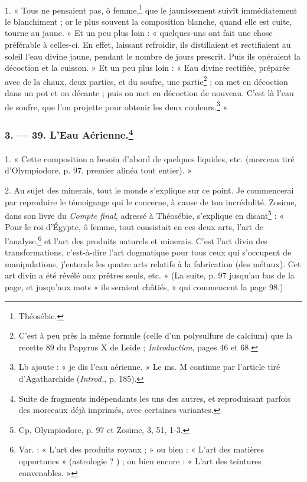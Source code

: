 \documentclass[landscape, a4paper, 11pt, oneside, polutonikogreek, french]{article}
\begin{document}
\paragraph{}
1. « Tous ne pensaient pas, ô femme,\footnote{Théosébie.} que le jaunissement suivît immédiatement le blanchiment ; or le plus souvent la composition blanche, quand elle est cuite, tourne au jaune. » Et un peu plus loin : « quelques-uns ont fait une chose préférable à celles-ci. En effet, laissant refroidir, ils distillaient et rectifiaient au soleil l'eau divine jaune, pendant le nombre de jours prescrit. Puis ils opéraient la décoction et la cuisson. » Et un peu plus loin : « Eau divine rectifiée, préparée avec de la chaux, deux parties, et du soufre, une partie\footnote{C'est à peu près la même formule (celle d'un polysulfure de calcium) que la recette 89 du Papyrus X de Leide ; \emph{Introduction}, pages 46 et 68.} ; on met en décoction dans un pot et on décante ; puis on met en décoction de nouveau. C'est là l'eau de soufre, que l'on projette pour obtenir les deux couleurs.\footnote{Lb ajoute : « je dis l'eau aérienne. » Le ms. M continue par l'article tiré d'Agatharchide (\emph{Introd.}, p. 185).} »

\bigskip
\centerline{\EightStarTaper}
\centerline{\EightStarTaper\EightStarTaper}
\bigskip

\subsubsection[3. --- 39. L'Eau Aérienne.]{3. --- 39. L'Eau Aérienne.\footnote{Suite de fragments indépendants les uns des autres, et reproduisant parfois des morceaux déjà imprimés, avec certaines variantes.}}
\paragraph{}
1. « Cette composition a besoin d'abord de quelques liquides, etc. (morceau tiré d'Olympiodore, p. 97, premier alinéa tout entier). »

2. Au sujet des minerais, tout le monde s'explique sur ce point. Je commencerai par reproduire le témoignage qui le concerne, à cause de ton incrédulité. Zosime, dans son livre du \emph{Compte final}, adressé à Théosébie, s'explique en disant\footnote{Cp. Olympiodore, p. 97 et Zosime, 3, 51, 1-3.} : « Pour le roi d'Égypte, ô femme, tout consistait en ces deux arts, l'art de l'analyse,\footnote{Var. : « L'art des produits royaux ; » ou bien : « L'art des matières opportunes » (astrologie ? ) ; ou bien encore : « L'art des teintures convenables. »} et l'art des produits naturels et minerais. C'est l'art divin des transformations, c'est-à-dire l'art dogmatique pour tous ceux qui s'occupent de manipulations, j'entends les quatre arts relatifs à la fabrication (des métaux). Cet art divin a été révélé aux prêtres seuls, etc. » (La suite, p. 97 jusqu'au bas de la page, et jusqu'aux mots « ils seraient châtiés, » qui commencent la page 98.)
\end{document}
